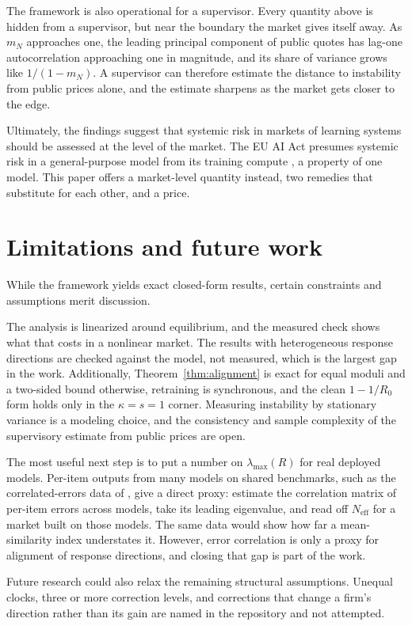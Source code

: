\documentclass[conference]{IEEEtran}
\theoremstyle{plain}
\newcommand{\Neff}{N_{\mathrm{eff}}}
\newcommand{\mN}{m_N}
\newcommand{\lmax}{\lambda_{\max}}
\begin{document}
The framework is also operational for a supervisor. Every quantity above is hidden from a supervisor, but near the boundary the market gives itself away. As $\mN$ approaches one, the leading principal component of public quotes has lag-one autocorrelation approaching one in magnitude, and its share of variance grows like $1/(1-\mN)$. A supervisor can therefore estimate the distance to instability from public prices alone, and the estimate sharpens as the market gets closer to the edge.

Ultimately, the findings suggest that systemic risk in markets of learning systems should be assessed at the level of the market. The EU AI Act presumes systemic risk in a general-purpose model from its training compute \cite{euaiact2024}, a property of one model. This paper offers a market-level quantity instead, two remedies that substitute for each other, and a price.

\section{Limitations and future work}
\label{sec:limits}

While the framework yields exact closed-form results, certain constraints and assumptions merit discussion.

The analysis is linearized around equilibrium, and the measured check shows what that costs in a nonlinear market. The results with heterogeneous response directions are checked against the model, not measured, which is the largest gap in the work. Additionally, Theorem~\ref{thm:alignment} is exact for equal moduli and a two-sided bound otherwise, retraining is synchronous, and the clean $1-1/R_0$ form holds only in the $\kappa=s=1$ corner. Measuring instability by stationary variance is a modeling choice, and the consistency and sample complexity of the supervisory estimate from public prices are open.

The most useful next step is to put a number on $\lmax(R)$ for real deployed models. Per-item outputs from many models on shared benchmarks, such as the correlated-errors data of \cite{kim2025}, give a direct proxy: estimate the correlation matrix of per-item errors across models, take its leading eigenvalue, and read off $\Neff$ for a market built on those models. The same data would show how far a mean-similarity index understates it. However, error correlation is only a proxy for alignment of response directions, and closing that gap is part of the work.

Future research could also relax the remaining structural assumptions. Unequal clocks, three or more correction levels, and corrections that change a firm's direction rather than its gain are named in the repository and not attempted.



\end{document}
